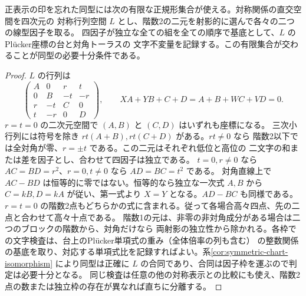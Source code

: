 \begin{proposition}\label{prop:singular-corner-positive-forms}
正表示の印を忘れた同型には次の有限な正規形集合が使える。対称関係の直交空間を四次元の
対称行列空間 $L$ とし、階数2の二元を射影的に選んで各々の二つの線型因子を取る。
四因子が独立な全ての組を全ての順序で基底として、$L$ のPlücker座標の台と対角トーラスの
文字不変量を記録する。この有限集合が交わることが同型の必要十分条件である。
\end{proposition}
\begin{proof}
$L$ の行列は
\[
 \begin{pmatrix}A&0&r&t\\0&B&-t&-r\\r&-t&C&0\\t&-r&0&D\end{pmatrix},\qquad
 XA+YB+C+D=A+B+WC+VD=0 .
\]
$r=t=0$ の二次元空間で $(A,B)$ と $(C,D)$ はいずれも座標になる。
三次小行列には符号を除き $rt(A+B),rt(C+D)$ がある。$rt\ne0$ なら
階数2以下では全対角が零、$r=\pm t$ である。この二元はそれぞれ低位と高位の
二文字の和または差を因子とし、合わせて四因子は独立である。
$t=0,r\ne0$ なら $AC=BD=r^2$、$r=0,t\ne0$ なら $AD=BC=t^2$ である。
対角直線上で $AC-BD$ は恒等的に零ではない。恒等的なら独立な一次式 $A,B$
から $C=kB,D=kA$ が従い、第一式より $X=Y$ となる。$AD-BC$ も同様である。
$r=t=0$ の階数2点もどちらかの式に含まれる。従って各場合高々四点、先の二点と合わせて高々十点である。
階数1の元は、非零の非対角成分がある場合は二つのブロックの階数から、対角だけなら
両射影の独立性から除かれる。各枠での文字検査は、台上のPlücker単項式の重み（全体倍率の列も含む）
の整数関係の基底を取り、対応する単項式比を記録すればよい。系\ref{cor:symmetric-chart-isomorphism}
により同型は正確に $L$ の合同であり、合同は因子枠を運ぶので判定は必要十分となる。
同じ検査は任意の他の対称表示との比較にも使え、階数2点の数または独立枠の存在が異なれば直ちに分離する。
\end{proof}
